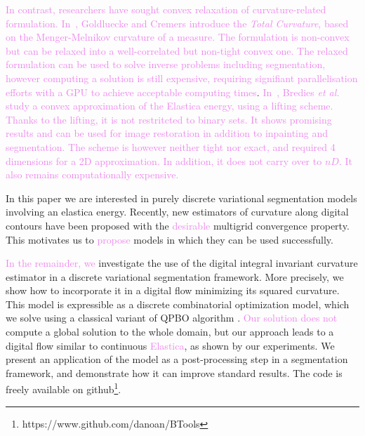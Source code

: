 \documentclass[runningheads]{llncs}
\newcommand{\HT}[1]{{\textcolor{violet}{#1}}}
\begin{document}
\HT{In contrast, researchers have sought convex relaxation of curvature-related
  formulation. In~\cite{goldluecke11totalcurvature}, Goldluecke and Cremers introduce the {\em Total Curvature}, based
  on the Menger-Melnikov curvature of a measure. The formulation is non-convex but can be relaxed into a well-correlated
  but non-tight convex one. The relaxed formulation can be used to solve inverse problems including segmentation,
  however computing a solution is still expensive, requiring signifiant parallelisation efforts with a GPU to achieve
  acceptable computing times}. \HT{In~\cite{bredies15convex}, Bredies {\em et al.} study a convex approximation of the
  Elastica energy, using a lifting scheme. Thanks to the lifting, it is not restritcted to binary sets. It shows
  promising results and can be used for image restoration in addition to inpainting and segmentation. The scheme is
  however neither tight nor exact, and required 4 dimensions for a 2D approximation. In addition, it does not carry over
  to $nD$. It also remains computationally expensive.}

In this paper we are interested in purely discrete variational segmentation models involving an elastica
energy. Recently, new estimators of curvature along digital contours have been proposed
\cite{roussillon11mdca,coeurjolly13integral,schindele17mdca} with the \HT{desirable} multigrid convergence property. This
motivates us to \HT{propose} models in which they can be used successfully.

\HT{In the remainder, we} investigate the use of the digital integral invariant curvature estimator
\cite{coeurjolly13integral} in a discrete variational segmentation framework. More precisely, we show how to incorporate
it in a digital flow minimizing its squared curvature. This model is expressible as a discrete combinatorial
optimization model, which we solve using a classical variant of QPBO algorithm \cite{rother07qpbo}. \HT{Our solution
  does not} compute a global solution to the whole domain, but our approach leads to a digital flow similar to
continuous \HT{Elastica}, as shown by our experiments. We present an application of the model as a post-processing step
in a segmentation framework, and demonstrate how it can improve standard results. The code is freely available on
github\footnote{https://www.github.com/danoan/BTools}.

\end{document}
